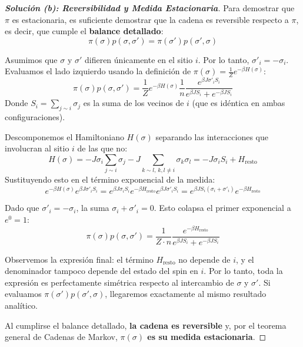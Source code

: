 \documentclass[10pt,a4paper]{article}
\begin{document}
\begin{proof}[\textbf{Solución (b): Reversibilidad y Medida Estacionaria}]
    Para demostrar que $\pi$ es estacionaria, es suficiente demostrar que la cadena es reversible respecto a $\pi$, es decir, que cumple el \textbf{balance detallado}:
    \[ \pi(\sigma) p(\sigma, \sigma') = \pi(\sigma') p(\sigma', \sigma) \]
    
    Asumimos que $\sigma$ y $\sigma'$ difieren únicamente en el sitio $i$. Por lo tanto, $\sigma'_i = -\sigma_i$.
    Evaluamos el lado izquierdo usando la definición de $\pi(\sigma) = \frac{1}{Z} e^{-\beta H(\sigma)}$:
    \[ \pi(\sigma) p(\sigma, \sigma') = \frac{1}{Z} e^{-\beta H(\sigma)} \frac{1}{n} \frac{e^{\beta J \sigma'_i S_i}}{e^{\beta J S_i} + e^{-\beta J S_i}} \]
    Donde $S_i = \sum_{j \sim i} \sigma_j$ es la suma de los vecinos de $i$ (que es idéntica en ambas configuraciones).
    
    Descomponemos el Hamiltoniano $H(\sigma)$ separando las interacciones que involucran al sitio $i$ de las que no:
    \[ H(\sigma) = -J \sigma_i \sum_{j \sim i} \sigma_j - J \sum_{k \sim l, \, k,l \neq i} \sigma_k \sigma_l = -J \sigma_i S_i + H_{\text{resto}} \]
    Sustituyendo esto en el término exponencial de la medida:
    \[ e^{-\beta H(\sigma)} e^{\beta J \sigma'_i S_i} = e^{\beta J \sigma_i S_i} e^{-\beta H_{\text{resto}}} e^{\beta J \sigma'_i S_i} = e^{\beta J S_i (\sigma_i + \sigma'_i)} e^{-\beta H_{\text{resto}}} \]
    
    Dado que $\sigma'_i = -\sigma_i$, la suma $\sigma_i + \sigma'_i = 0$. Esto colapsa el primer exponencial a $e^0 = 1$:
    \[ \pi(\sigma) p(\sigma, \sigma') = \frac{1}{Z \cdot n} \frac{e^{-\beta H_{\text{resto}}}}{e^{\beta J S_i} + e^{-\beta J S_i}} \]
    
    Observemos la expresión final: el término $H_{\text{resto}}$ no depende de $i$, y el denominador tampoco depende del estado del spin en $i$. Por lo tanto, toda la expresión es perfectamente simétrica respecto al intercambio de $\sigma$ y $\sigma'$. Si evaluamos $\pi(\sigma') p(\sigma', \sigma)$, llegaremos exactamente al mismo resultado analítico.
    
    Al cumplirse el balance detallado, \textbf{la cadena es reversible} y, por el teorema general de Cadenas de Markov, \textbf{$\pi(\sigma)$ es su medida estacionaria}.
\end{proof}

\vspace{5mm}
\end{document}

